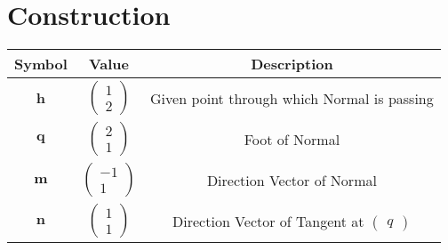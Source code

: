 \documentclass[journal,10pt,twocolumn]{article}
\let\vec\mathbf
\newcommand{\myvec}[1]{\ensuremath{\begin{pmatrix}#1\end{pmatrix}}}
\begin{document}
\section*{\large Construction}
{
\setlength\extrarowheight{5pt}
\begin{tabular}{|c|c|c|}
	\hline
	\textbf{Symbol}&\textbf{Value}&\textbf{Description}\\[5pt]
	\hline
	$\vec{h}$&$\myvec{1 \\ 2}$&Given point through which Normal is passing\\[5pt]
	\hline
	$\vec{q}$&$\myvec{2 \\ 1}$&Foot of Normal\\[5pt]
	\hline
	$\vec{m}$ & $\myvec{-1 \\ 1}$ & Direction Vector of Normal\\[5pt]
	\hline
	$\vec{n}$ & $\myvec{1 \\ 1}$ & Direction Vector of Tangent at $\myvec{q}$\\
	\hline
\end{tabular}
}
\end{document}

